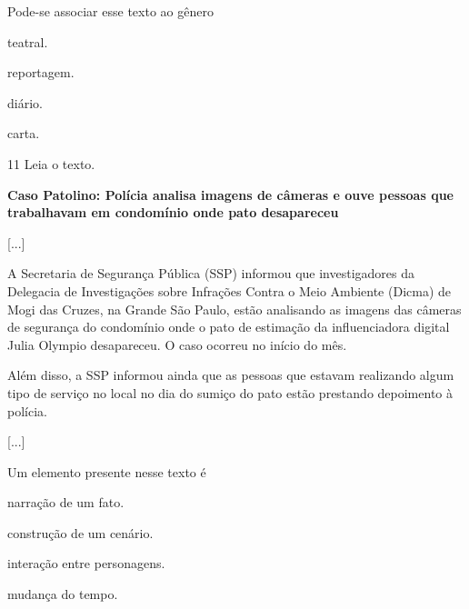 Pode-se associar esse texto ao gênero

\begin{escolha}
\item teatral.

\item reportagem.

\item diário.

\item carta.
\end{escolha}

\num{11} Leia o texto.

\begin{myquote}
\textbf{Caso Patolino: Polícia analisa imagens de câmeras e ouve pessoas que trabalhavam em condomínio onde pato desapareceu}

{[}...{]}

A Secretaria de Segurança Pública (SSP) informou que investigadores da
Delegacia de Investigações sobre Infrações Contra o Meio Ambiente
(Dicma) de Mogi
das Cruzes, na Grande São Paulo, estão analisando as imagens das
câmeras de segurança do condomínio onde
o pato de estimação da influenciadora digital Julia Olympio desapareceu.
O caso ocorreu no início do mês.

Além disso, a SSP informou ainda que as pessoas que estavam realizando
algum tipo de serviço no local no dia do sumiço do pato estão prestando
depoimento à polícia.

{[}...{]}

\end{myquote}

Um elemento presente nesse texto é

\begin{escolha}
\item narração de um fato.

\item construção de um cenário.

\item interação entre personagens.

\item mudança do tempo.
\end{escolha}

